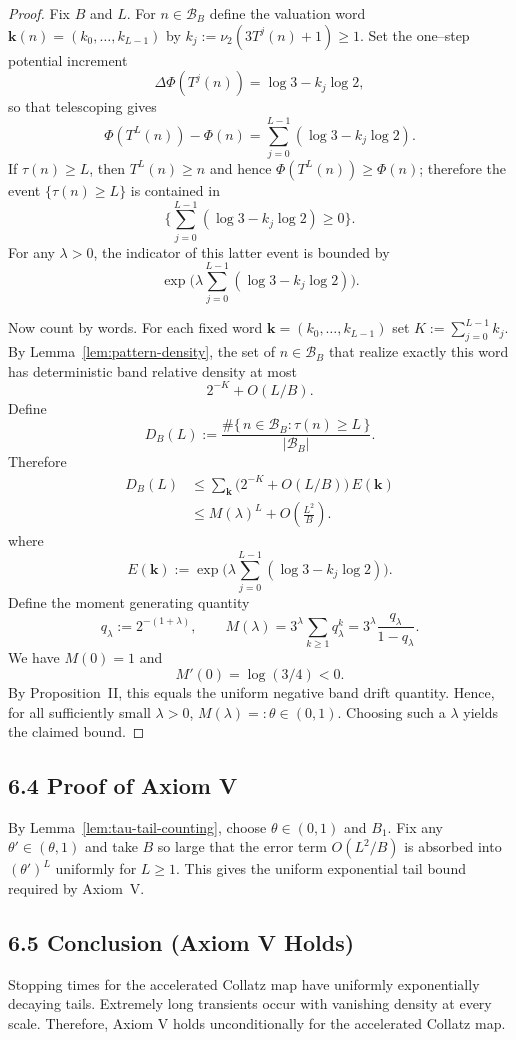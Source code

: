 \documentclass[preprint,12pt]{elsarticle}
\begin{document}
\begin{proof}
Fix $B$ and $L$. For $n\in\mathcal{B}_B$ define the valuation word
$\mathbf{k}(n)=(k_0,\dots,k_{L-1})$ by
$k_j:=\nu_2(3T^j(n)+1)\ge 1$.
Set the one--step potential increment
\[\Delta\Phi(T^j(n))=\log 3 - k_j\log 2,\]
so that telescoping gives
\[\Phi(T^L(n)) - \Phi(n)=\sum_{j=0}^{L-1}(\log 3 - k_j\log 2).\]
If $\tau(n)\ge L$, then $T^L(n)\ge n$ and hence $\Phi(T^L(n))\ge \Phi(n)$;
therefore the event $\{\tau(n)\ge L\}$ is contained in
\[\Big\{\sum_{j=0}^{L-1}(\log 3 - k_j\log 2)\ge 0\Big\}.
\]
For any $\lambda>0$, the indicator of this latter event is bounded by
\[
\exp\!\big(\lambda\sum_{j=0}^{L-1}(\log 3 - k_j\log 2)\big).
\]

Now count by words. For each fixed word $\mathbf{k}=(k_0,\dots,k_{L-1})$ set
$K:=\sum_{j=0}^{L-1}k_j$. By Lemma~\ref{lem:pattern-density}, the set of
$n\in\mathcal{B}_B$ that realize exactly this word has deterministic band
relative density at most
\[
2^{-K}+O(L/B).
\]
Define
\[
D_B(L):=\frac{\#\{\,n\in\mathcal{B}_B:\tau(n)\ge L\,\}}{|\mathcal{B}_B|}.
\]
Therefore
\begin{align*}
D_B(L)
&\le \sum_{\mathbf{k}}\big(2^{-K}+O(L/B)\big)\,E(\mathbf{k})\\
&\le M(\lambda)^L
+ O\!\left(\frac{L^2}{B}\right).
\end{align*}
where
\[
E(\mathbf{k}):=\exp\!\Big(\lambda\sum_{j=0}^{L-1}(\log 3 - k_j\log 2)\Big).
\]
Define the moment generating quantity
\[
q_\lambda:=2^{-(1+\lambda)},
\qquad
M(\lambda)=3^{\lambda}\sum_{k\ge 1}q_\lambda^k
=3^{\lambda}\frac{q_\lambda}{1-q_\lambda}.
\]
We have $M(0)=1$ and
\[
M'(0)=\log(3/4)<0.
\]
By Proposition~II, this equals the uniform negative band drift quantity.
Hence, for all sufficiently small $\lambda>0$,
$M(\lambda)=:\theta\in(0,1)$.
Choosing such a $\lambda$ yields the claimed bound.
\end{proof}

\subsection{6.4 Proof of Axiom V}
By Lemma~\ref{lem:tau-tail-counting}, choose $\theta\in(0,1)$ and $B_1$.
Fix any $\theta'\in(\theta,1)$ and take $B$ so large that the error term
$O(L^2/B)$ is absorbed into $(\theta')^L$ uniformly for $L\ge 1$.
This gives the uniform exponential tail bound required by Axiom~V.

\subsection*{6.5 Conclusion (Axiom V Holds)}
Stopping times for the accelerated Collatz map have uniformly exponentially decaying tails. Extremely long transients occur with vanishing density at every scale.
Therefore, Axiom V holds unconditionally for the accelerated Collatz map.
\end{document}
